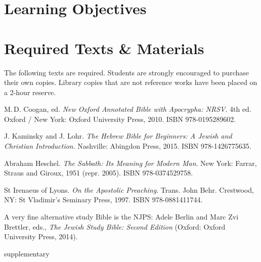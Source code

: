 \documentclass[titlepage]{article}
\newcommand\incl{../includes}
\begin{document}


\section{Learning Objectives}
\label{objectives}

\edobject

\section{Required Texts \& Materials}
\label{texts}

The following texts are required. Students are strongly encouraged to
purchase their own copies. Library copies that are not reference works
have been placed on a 2-hour reserve.

\begingroup
\renewcommand{\section}[2]{}%
\begin{thebibliography}{Irenaeus}%

	 M.\,D. Coogan, ed.
    \emph{New Oxford Annotated Bible with Apocrypha: NRSV}. 4th ed.
    Oxford / New York: Oxford University Press, 2010.
    ISBN 978-0195289602.

	 J. Kaminsky and J. Lohr.
	\emph{The Hebrew Bible for Beginners: A Jewish and Christian Introduction}.
	Nashville: Abingdon Press, 2015.
	ISBN 978-1426775635.

	 Abraham Heschel.
	\emph{The Sabbath: Its Meaning for Modern Man}.
	New York: Farrar, Straus and Giroux, 1951 (repr. 2005).
	ISBN 978-0374529758.

	 St Irenaeus of Lyons.
	\emph{On the Apostolic Preaching}.
	Trans. John Behr.
	Crestwood, NY: St Vladimir’s Seminary Press, 1997.
	ISBN 978-0881411744.

\end{thebibliography}
\endgroup

A very fine alternative study Bible is the NJPS: Adele Berlin and Marc
Zvi Brettler, eds., \emph{The Jewish Study Bible: Second Edition}
(Oxford: Oxford University Press, 2014).

\section{Supplementary Texts}
\label{supplementary}
\end{document}
